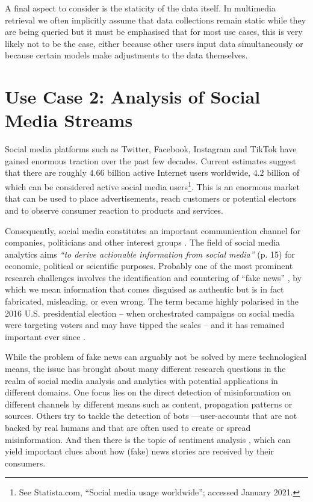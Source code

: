 A final aspect to consider is the staticity of the data itself. In multimedia retrieval we often implicitly assume that data collections remain static while they are being queried but it must be emphasised that for most use cases, this is very likely not to be the case, either because other users input data simultaneously or because certain models make adjustments to the data themselves.

\section{Use Case 2: Analysis of Social Media Streams}
\label{section:application_online_analysis}

Social media platforms such as Twitter, Facebook, Instagram and TikTok have gained enormous traction over the past few decades. Current estimates suggest that there are roughly $4.66$ billion active Internet users worldwide, $4.2$ billion of which can be considered active social media users\footnote{See Statista.com, ``Social media usage worldwide''; accessed January 2021.}. This is an enormous market that can be used to place advertisements, reach customers or potential electors and to observe consumer reaction to products and services.

Consequently, social media constitutes an important communication channel for companies, politicians and other interest groups \cite{Barbera:2018New}. The field of social media analytics aims \emph{``to derive actionable information from social media''} \cite{Zheng:2010Social} (p. 15) for economic, political or scientific purposes. Probably one of the most prominent research challenges involves the identification and countering of ``fake news'' \cite{Lazer:2018Science}, by which we mean information that comes disguised as authentic but is in fact fabricated, misleading, or even wrong. The term became highly polarised in the 2016 U.S. presidential election \cite{Quandt:2019Fake} -- when orchestrated campaigns on social media were targeting voters and may have tipped the scales -- and it has remained important ever since \cite{Ferrara:2020Characterizing}.

While the problem of fake news can arguably not be solved by mere technological means, the issue has brought about many different research questions in the realm of social media analysis and analytics with potential applications in different domains. One focus lies on the direct detection of misinformation on different channels by different means such as content, propagation patterns \cite{Zhou:2020Survey} or sources. Others try to tackle the detection of bots \cite{Davis:2016BotOrNot,Cresci:2020Decade}---user-accounts that are not backed by real humans and that are often used to create or spread misinformation. And then there is the topic of sentiment analysis \cite{Yue:2019Survey}, which can yield important clues about how (fake) news stories are received by their consumers.

